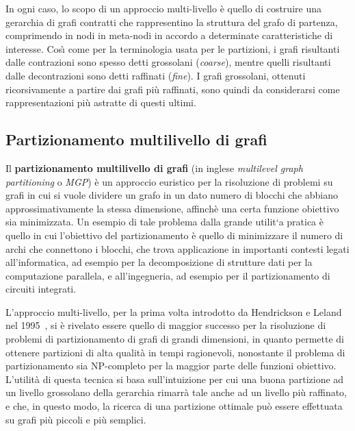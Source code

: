 In ogni caso, lo scopo di un approccio multi-livello \`e quello di costruire una gerarchia di grafi contratti
che rappresentino la struttura del grafo di partenza, comprimendo in nodi in meta-nodi in accordo a determinate
caratteristiche di interesse.
Cos\`{\i} come per la terminologia usata per le partizioni, i grafi risultanti dalle contrazioni sono spesso detti
grossolani (\textit{coarse}), mentre quelli risultanti dalle decontrazioni sono detti raffinati (\textit{fine}).
I grafi grossolani, ottenuti ricorsivamente a partire dai grafi pi\`u raffinati, sono quindi da considerarsi
come rappresentazioni pi\`u astratte di questi ultimi. \newline

\subsection{Partizionamento multilivello di grafi}\label{subsec:partizionamento-multilivello-di-grafi}
Il \textbf{partizionamento multilivello di grafi} (in inglese \textit{multilevel graph partitioning} o \textit{MGP})
\`e un approccio euristico per la risoluzione di problemi su grafi in cui si vuole dividere un grafo in un dato numero
di blocchi che abbiano approssimativamente la stessa dimensione, affinch\`e una certa funzione obiettivo sia
minimizzata. \newline
Un esempio di tale problema dalla grande utilit`a pratica \`e quello in cui l'obiettivo del partizionamento \`e quello
di minimizzare il numero di archi che connettono i blocchi, che trova applicazione in importanti contesti legati
all'informatica, ad esempio per la decomposizione di strutture dati per la computazione parallela, e all'ingegneria,
ad esempio per il partizionamento di circuiti integrati. \newline

L'approccio multi-livello, per la prima volta introdotto da Hendrickson e Leland nel
1995~\cite{Hendrickson:1995:MPG:221253.221279}, si \`e rivelato essere quello di maggior successo per la risoluzione
di problemi di partizionamento di grafi di grandi dimensioni, in quanto permette di ottenere partizioni di alta
qualit\`a in tempi ragionevoli, nonostante il problema di partizionamento sia NP-completo per la maggior parte delle
funzioni obiettivo. \newline
L'utilit\`a di questa tecnica si basa sull'intuizione per cui una buona partizione ad un livello grossolano della
gerarchia rimarr\`a tale anche ad un livello pi\`u raffinato, e che, in questo modo, la ricerca di una
partizione ottimale pu\`o essere effettuata su grafi pi\`u piccoli e pi\`u semplici. \newline

